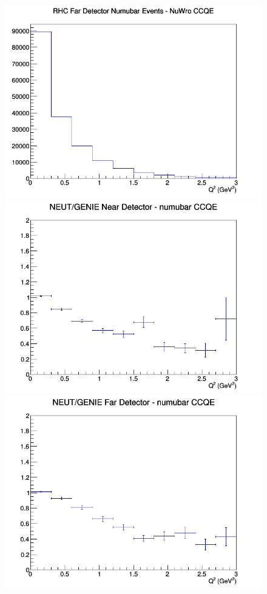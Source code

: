 \begin{figure}[h]
\endminipage
{}
\includegraphics[width=\linewidth]{eff_Q2/GAr/CCQE_RHC_FD_numubar_Q2_NuWro.png}
\endminipage
\newline
{}
\includegraphics[width=\linewidth]{eff_Q2/GAr/ratios/CCQE_NEUT_GENIE_numubar_near_Q2.png}
\endminipage
{}
\includegraphics[width=\linewidth]{eff_Q2/GAr/ratios/CCQE_NEUT_GENIE_numubar_far_Q2.png}

\end{figure}
